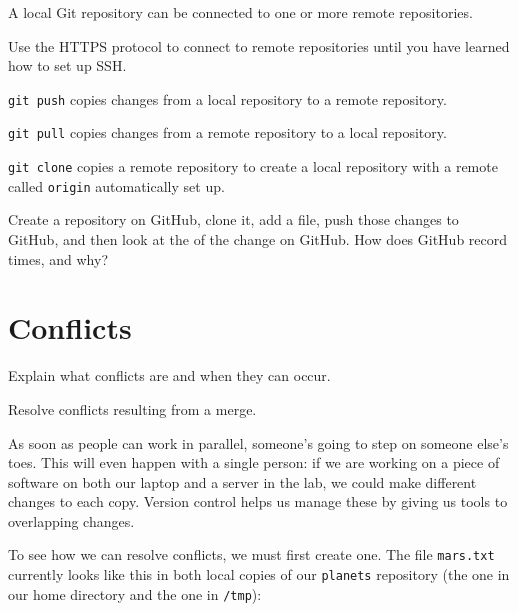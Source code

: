 \begin{keypoints}
\begin{swcitemize}
\item
  A local Git repository can be connected to one or more remote
  repositories.
\item
  Use the HTTPS protocol to connect to remote repositories until you
  have learned how to set up SSH.
\item
  \texttt{git push} copies changes from a local repository to a remote
  repository.
\item
  \texttt{git pull} copies changes from a remote repository to a local
  repository.
\item
  \texttt{git clone} copies a remote repository to create a local
  repository with a remote called \texttt{origin} automatically set up.
\end{swcitemize}
\end{keypoints}

\begin{challenge}
  Create a repository on GitHub, clone it, add a file, push those
  changes to GitHub, and then look at the
   of the change on GitHub. How does
  GitHub record times, and why?
\end{challenge}

\section{Conflicts}

\begin{objectives}
\begin{swcitemize}
\item
  Explain what conflicts are and when they can occur.
\item
  Resolve conflicts resulting from a merge.
\end{swcitemize}
\end{objectives}

As soon as people can work in parallel, someone's going to step on
someone else's toes. This will even happen with a single person: if we
are working on a piece of software on both our laptop and a server in
the lab, we could make different changes to each copy. Version control
helps us manage these  by giving us
tools to  overlapping changes.

To see how we can resolve conflicts, we must first create one. The file
\texttt{mars.txt} currently looks like this in both local copies of our
\texttt{planets} repository (the one in our home directory and the one
in \texttt{/tmp}):

